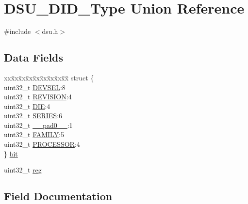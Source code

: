 \hypertarget{union_d_s_u___d_i_d___type}{}\section{D\+S\+U\+\_\+\+D\+I\+D\+\_\+\+Type Union Reference}
\label{union_d_s_u___d_i_d___type}


{\ttfamily \#include $<$dsu.\+h$>$}

\subsection*{Data Fields}
\begin{DoxyCompactItemize}
\item 
\begin{tabbing}
xx\=xx\=xx\=xx\=xx\=xx\=xx\=xx\=xx\=\kill
struct \{\\
\>uint32\_t \mbox{\hyperlink{union_d_s_u___d_i_d___type_a8da25d83c426e8cb319e3c88c9e46ad9}{DEVSEL}}:8\\
\>uint32\_t \mbox{\hyperlink{union_d_s_u___d_i_d___type_a8f4be4e701bc29e4363db19a3452906a}{REVISION}}:4\\
\>uint32\_t \mbox{\hyperlink{union_d_s_u___d_i_d___type_afc409b59dc5040a5a7df75191b1272ed}{DIE}}:4\\
\>uint32\_t \mbox{\hyperlink{union_d_s_u___d_i_d___type_aec1777cca650ee0df32be9620d7e6800}{SERIES}}:6\\
\>uint32\_t \mbox{\hyperlink{union_d_s_u___d_i_d___type_a3e57c2ef1c3ffb36722f000cc1156824}{\_\_pad0\_\_}}:1\\
\>uint32\_t \mbox{\hyperlink{union_d_s_u___d_i_d___type_a944ef987106b4a0159e66f52d6301185}{FAMILY}}:5\\
\>uint32\_t \mbox{\hyperlink{union_d_s_u___d_i_d___type_a53a30227239ed5e9e6fef6459081810c}{PROCESSOR}}:4\\
\} \mbox{\hyperlink{union_d_s_u___d_i_d___type_a51c6c1e4abfe118ebd96251f2a676663}{bit}}\\

\end{tabbing}\item 
uint32\+\_\+t \mbox{\hyperlink{union_d_s_u___d_i_d___type_a6b91636401516a477989a336376d7b40}{reg}}
\end{DoxyCompactItemize}


\subsection{Field Documentation}
\mbox{\label{union_d_s_u___d_i_d___type_a3e57c2ef1c3ffb36722f000cc1156824}} 
